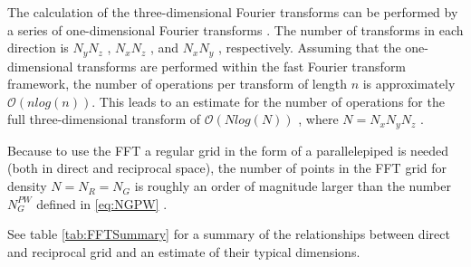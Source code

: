 \documentclass[a4paper,12pt]{article}
\begin{document}
The calculation of the three-dimensional Fourier transforms can be performed by a
series of one-dimensional Fourier transforms \cite{Marx}. The number of transforms in
each direction is $N_y N_z$ , $N_x N_z$ , and $N_x N_y$ , respectively. Assuming that the
one-dimensional transforms are performed within the fast Fourier transform
framework, the number of operations per transform of length $n$ is approximately $\mathcal{O}(n log(n))$. This leads to an estimate for the number of operations for the full three-dimensional transform of $\mathcal{O}(N log(N))$ , where $N = N_x N_y N_z$ .

Because to use the FFT a regular grid in the form of a parallelepiped is needed (both in direct and reciprocal space), the number of points in the FFT grid for density $N = N_{R} = N_{G}$ is roughly an order of magnitude larger than the number $N_{G}^{PW}$ defined in \eqref{eq:NGPW} \cite{Martin}.

See table \ref{tab:FFTSummary} for a summary of the relationships between direct and reciprocal grid and an estimate of their typical dimensions.
\end{document}
